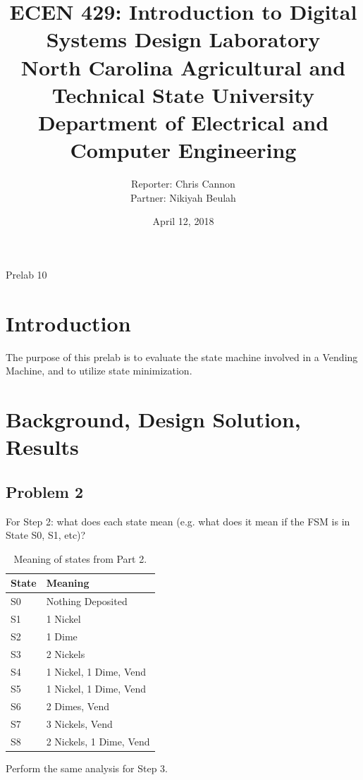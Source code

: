 \documentclass[11pt]{article}
\title {{\titleFont ECEN 429: Introduction to Digital Systems Design Laboratory \\ North Carolina Agricultural and Technical State University \\ Department of Electrical and Computer Engineering}} %
\author{\titleFont Reporter: Chris Cannon \\ Partner: Nikiyah Beulah} %
\date{\titleFont April 12, 2018}
\begin{document}
\begin{titlingpage}
\maketitle
\begin{center}
	Prelab 10
\end{center}
\end{titlingpage}

\section{Introduction}
The purpose of this prelab is to evaluate the state machine involved in a Vending Machine, and to utilize state minimization.

\section{Background, Design Solution, Results}

\subsection{Problem 2}
For Step 2: what does each state mean (e.g. what does it mean if the FSM is in State S0, S1, etc)?

\begin{table}[H]
\begin{center}
\begin{tabular}{| l | l |}
	\hline
	State & Meaning \\ \hline
	S0 & Nothing Deposited \\ \hline
	S1 & 1 Nickel \\ \hline
	S2 & 1 Dime \\ \hline
	S3 & 2 Nickels \\ \hline
	S4 & 1 Nickel, 1 Dime, Vend \\ \hline
	S5 & 1 Nickel, 1 Dime, Vend \\ \hline
	S6 & 2 Dimes, Vend \\ \hline
	S7 & 3 Nickels, Vend \\ \hline
	S8 & 2 Nickels, 1 Dime, Vend \\ \hline
\end{tabular}
\caption{\label{tab:Part2States}Meaning of states from Part 2.}
\end{center}
\end{table}

Perform the same analysis for Step 3.
\end{document}
